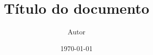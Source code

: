 \documentclass[11pt,a4paper]{article}
\title{Título do documento}
\author{Autor}
\date{\today}
\begin{document}
\maketitle
\begin{abstract}

\end{abstract}



\end{document}
